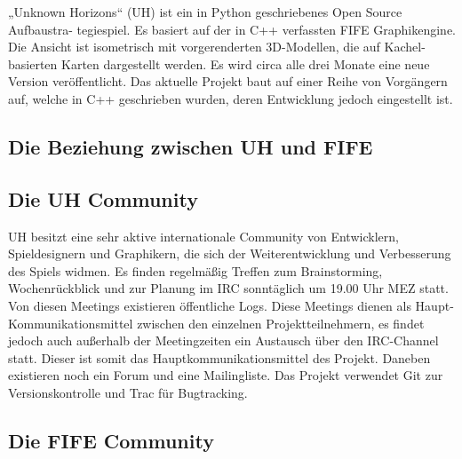 „Unknown Horizons“ (UH) ist ein in Python geschriebenes Open Source Aufbaustra-
tegiespiel. Es basiert auf der in C++
verfassten FIFE Graphikengine. Die Ansicht ist isometrisch mit vorgerenderten 3D-Modellen,
die auf Kachel-basierten Karten dargestellt werden. Es wird circa alle drei Monate eine neue Version
veröffentlicht. Das aktuelle Projekt baut auf einer Reihe von Vorgängern auf, welche
in C++ geschrieben wurden, deren Entwicklung jedoch eingestellt ist.

\subsection{Die Beziehung zwischen UH und FIFE}

\subsection{Die UH Community}
UH besitzt eine sehr aktive internationale Community von Entwicklern, Spieldesignern und Graphikern, die
sich der Weiterentwicklung und Verbesserung des Spiels widmen.
Es finden regelmäßig Treffen zum Brainstorming, Wochenrückblick
und zur Planung im IRC sonntäglich um 19.00 Uhr MEZ statt. Von diesen Meetings existieren
öffentliche Logs.
Diese Meetings dienen als Haupt-Kommunikationsmittel zwischen den einzelnen Projektteilnehmern,
es findet jedoch auch außerhalb der Meetingzeiten ein Austausch über den  IRC-Channel statt.
Dieser ist somit das
 Hauptkommunikationsmittel des Projekt. Daneben existieren noch ein Forum
und eine Mailingliste. Das Projekt verwendet Git zur Versionskontrolle und Trac für
Bugtracking.

\subsection{Die FIFE Community}

